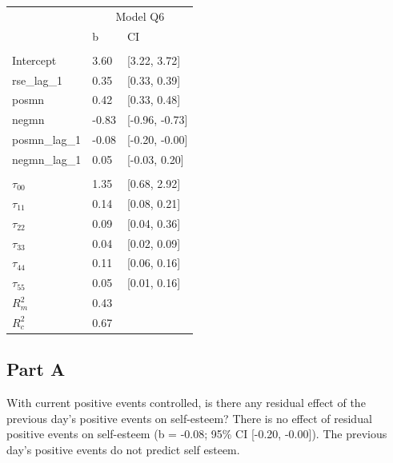 \documentclass[]{article}
\begin{document}
\begin{table}[H]
\centering
\begin{tabular}{lll}
\toprule
\multicolumn{1}{c}{ } & \multicolumn{2}{c}{Model Q6} \\
\cmidrule(l{2pt}r{2pt}){2-3}
 & b & CI\\
\midrule
\addlinespace[0.3em]
\multicolumn{3}{l}{\textbf{Fixed}}\\
\hspace{1em}Intercept & 3.60 & [3.22, 3.72]\\
\hspace{1em}rse\_lag\_1 & 0.35 & [0.33, 0.39]\\
\hspace{1em}posmn & 0.42 & [0.33, 0.48]\\
\hspace{1em}negmn & -0.83 & [-0.96, -0.73]\\
\hspace{1em}posmn\_lag\_1 & -0.08 & [-0.20, -0.00]\\
\hspace{1em}negmn\_lag\_1 & 0.05 & [-0.03, 0.20]\\
\addlinespace[0.3em]
\multicolumn{3}{l}{\textbf{Random}}\\
\hspace{1em}$\tau_{00}$ & 1.35 & [0.68, 2.92]\\
\hspace{1em}$\tau_{11}$ & 0.14 & [0.08, 0.21]\\
\hspace{1em}$\tau_{22}$ & 0.09 & [0.04, 0.36]\\
\hspace{1em}$\tau_{33}$ & 0.04 & [0.02, 0.09]\\
\hspace{1em}$\tau_{44}$ & 0.11 & [0.06, 0.16]\\
\hspace{1em}$\tau_{55}$ & 0.05 & [0.01, 0.16]\\
$R^2_m$ & 0.43 & \\
$R^2_c$ & 0.67 & \\
\bottomrule
\end{tabular}
\end{table}

\subsection{Part A}\label{part-a-4}

With current positive events controlled, is there any residual effect of
the previous day's positive events on self-esteem? There is no effect of
residual positive events on self-esteem (b = -0.08; 95\% CI {[}-0.20,
-0.00{]}). The previous day's positive events do not predict self
esteem.
\end{document}
